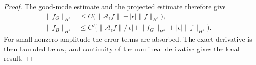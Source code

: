 \begin{proof}
The good-mode estimate and the projected estimate
therefore give
\begin{align*}
 \|f_G\|_{H^s}
   &\le C\big(\|\mathcal A_\epsilon f\|+
                 |\epsilon|\|f\|_{H^s}\big),\\
 \|f_B\|_{H^s}
   &\le C'\big(\|\mathcal A_\epsilon f\|/|\epsilon|+
                  \|f_G\|_{H^s}+|\epsilon|\|f\|_{H^s}\big).
\end{align*}
For small nonzero amplitude the error terms
are absorbed. The exact derivative is then bounded
below, and continuity of the nonlinear derivative
gives the local result.
\end{proof}
